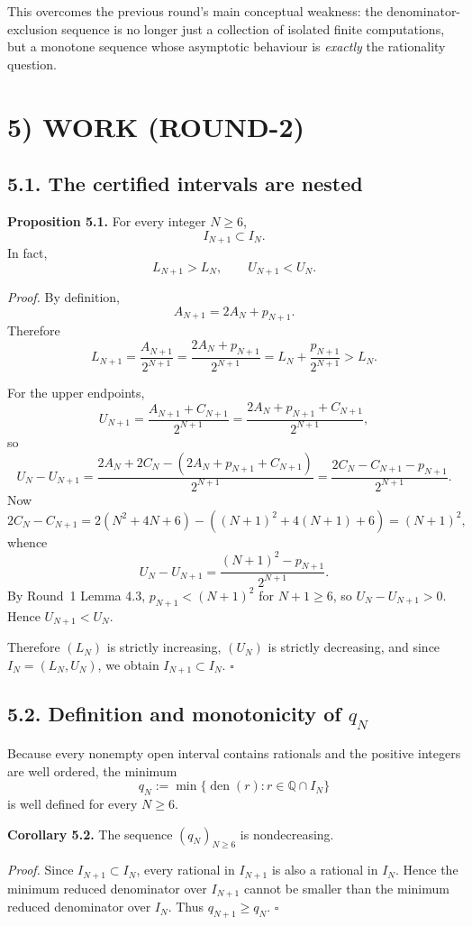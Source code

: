 This overcomes the previous round's main conceptual weakness: the denominator-exclusion sequence is no longer just a collection of isolated finite computations, but a monotone sequence whose asymptotic behaviour is \emph{exactly} the rationality question.

\section*{5) WORK (ROUND-2)}

\subsection*{5.1. The certified intervals are nested}

\medskip
\noindent\textbf{Proposition 5.1.}
For every integer \(N\ge 6\),
\[
I_{N+1}\subset I_N.
\]
In fact,
\[
L_{N+1}>L_N,
\qquad
U_{N+1}<U_N.
\]

\emph{Proof.}
By definition,
\[
A_{N+1}=2A_N+p_{N+1}.
\]
Therefore
\[
L_{N+1}=\frac{A_{N+1}}{2^{N+1}}=\frac{2A_N+p_{N+1}}{2^{N+1}}=L_N+\frac{p_{N+1}}{2^{N+1}}>L_N.
\]

For the upper endpoints,
\[
U_{N+1}=\frac{A_{N+1}+C_{N+1}}{2^{N+1}}
=\frac{2A_N+p_{N+1}+C_{N+1}}{2^{N+1}},
\]
so
\[
U_N-U_{N+1}
=\frac{2A_N+2C_N-(2A_N+p_{N+1}+C_{N+1})}{2^{N+1}}
=\frac{2C_N-C_{N+1}-p_{N+1}}{2^{N+1}}.
\]
Now
\[
2C_N-C_{N+1}
=2(N^2+4N+6)-((N+1)^2+4(N+1)+6)
=(N+1)^2,
\]
whence
\[
U_N-U_{N+1}=\frac{(N+1)^2-p_{N+1}}{2^{N+1}}.
\]
By Round~1 Lemma 4.3, \(p_{N+1}<(N+1)^2\) for \(N+1\ge 6\), so \(U_N-U_{N+1}>0\). Hence \(U_{N+1}<U_N\).

Therefore \((L_N)\) is strictly increasing, \((U_N)\) is strictly decreasing, and since \(I_N=(L_N,U_N)\), we obtain \(I_{N+1}\subset I_N\). \hfill$\square$

\subsection*{5.2. Definition and monotonicity of \(q_N\)}

Because every nonempty open interval contains rationals and the positive integers are well ordered, the minimum
\[
q_N:=\min\{\operatorname{den}(r): r\in\mathbb Q\cap I_N\}
\]
is well defined for every \(N\ge 6\).

\medskip
\noindent\textbf{Corollary 5.2.}
The sequence \((q_N)_{N\ge 6}\) is nondecreasing.

\emph{Proof.}
Since \(I_{N+1}\subset I_N\), every rational in \(I_{N+1}\) is also a rational in \(I_N\). Hence the minimum reduced denominator over \(I_{N+1}\) cannot be smaller than the minimum reduced denominator over \(I_N\). Thus \(q_{N+1}\ge q_N\). \hfill$\square$

